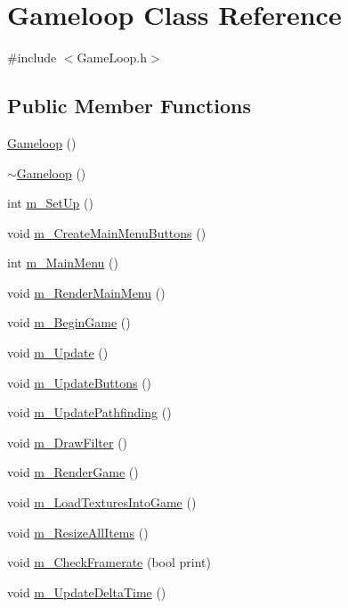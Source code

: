 \hypertarget{class_gameloop}{}\section{Gameloop Class Reference}
\label{class_gameloop}


{\ttfamily \#include $<$Game\+Loop.\+h$>$}

\subsection*{Public Member Functions}
\begin{DoxyCompactItemize}
\item 
\mbox{\hyperlink{class_gameloop_a18f9a1686565e206b40718ed787aeb97}{Gameloop}} ()
\item 
\mbox{\hyperlink{class_gameloop_ac0aff9533f00b23557a7d7b348b95007}{$\sim$\+Gameloop}} ()
\item 
int \mbox{\hyperlink{class_gameloop_ad295af6c73c59dac924e98443c83e926}{m\+\_\+\+Set\+Up}} ()
\item 
void \mbox{\hyperlink{class_gameloop_aa519481395dbc15336ccdf0ee3c62a6e}{m\+\_\+\+Create\+Main\+Menu\+Buttons}} ()
\item 
int \mbox{\hyperlink{class_gameloop_a81bdca7a10e6ada05aa7d49aac051b2a}{m\+\_\+\+Main\+Menu}} ()
\item 
void \mbox{\hyperlink{class_gameloop_a0c2cc3c326347e83886af3b2d7bfd422}{m\+\_\+\+Render\+Main\+Menu}} ()
\item 
void \mbox{\hyperlink{class_gameloop_a72364d9b616a3d5b8372045586bf9f7e}{m\+\_\+\+Begin\+Game}} ()
\item 
void \mbox{\hyperlink{class_gameloop_aec0cdc82daf752449dcd50839df2a0ba}{m\+\_\+\+Update}} ()
\item 
void \mbox{\hyperlink{class_gameloop_aedfd3bd058a404e998b7bfb828805d34}{m\+\_\+\+Update\+Buttons}} ()
\item 
void \mbox{\hyperlink{class_gameloop_a83ba5afb76dcab4bca8e039ce268615f}{m\+\_\+\+Update\+Pathfinding}} ()
\item 
void \mbox{\hyperlink{class_gameloop_a1c6fae011436c57d4009fb1d82f9aa1b}{m\+\_\+\+Draw\+Filter}} ()
\item 
void \mbox{\hyperlink{class_gameloop_a3b821efb88c89c1baa76b80880f40f71}{m\+\_\+\+Render\+Game}} ()
\item 
void \mbox{\hyperlink{class_gameloop_a5933a8857ab670ff36542a280660d30e}{m\+\_\+\+Load\+Textures\+Into\+Game}} ()
\item 
void \mbox{\hyperlink{class_gameloop_af8b85224ff509ae981a1d02b9dff7fa6}{m\+\_\+\+Resize\+All\+Items}} ()
\item 
void \mbox{\hyperlink{class_gameloop_ae7b1ebe386616dd1e7c49d7132c932b9}{m\+\_\+\+Check\+Framerate}} (bool print)
\item 
void \mbox{\hyperlink{class_gameloop_a957a1e49a0acd252fed9e76547528790}{m\+\_\+\+Update\+Delta\+Time}} ()
\end{DoxyCompactItemize}

